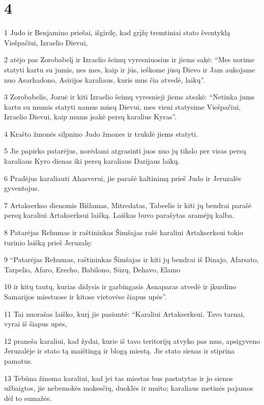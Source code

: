 \chapter{4}


\par 1 Judo ir Benjamino priešai, išgirdę, kad grįžę tremtiniai stato šventyklą Viešpačiui, Izraelio Dievui, 
\par 2 atėjo pas Zorobabelį ir Izraelio šeimų vyresniuosius ir jiems sakė: “Mes norime statyti kartu su jumis, nes mes, kaip ir jūs, ieškome jūsų Dievo ir Jam aukojame nuo Asarhadono, Asirijos karaliaus, kuris mus čia atvedė, laikų”. 
\par 3 Zorobabelis, Jozuė ir kiti Izraelio šeimų vyresnieji jiems atsakė: “Netinka jums kartu su mumis statyti namus mūsų Dievui, mes vieni statysime Viešpačiui, Izraelio Dievui, kaip mums įsakė persų karalius Kyras”. 
\par 4 Krašto žmonės silpnino Judo žmones ir trukdė jiems statyti. 
\par 5 Jie papirko patarėjus, norėdami atgrasinti juos nuo jų tikslo per visas persų karaliaus Kyro dienas iki persų karaliaus Darijaus laikų. 
\par 6 Pradėjus karaliauti Ahasverui, jie parašė kaltinimą prieš Judo ir Jeruzalės gyventojus. 
\par 7 Artakserkso dienomis Bišlamas, Mitredatas, Tabeelis ir kiti jų bendrai parašė persų karaliui Artakserksui laišką. Laiškas buvo parašytas aramėjų kalba. 
\par 8 Patarėjas Rehumas ir raštininkas Šimšajas rašė karaliui Artakserksui tokio turinio laišką prieš Jeruzalę: 
\par 9 “Patarėjas Rehumas, raštininkas Šimšajas ir kiti jų bendrai iš Dinajo, Afarsato, Tarpelio, Afaro, Erecho, Babilono, Sūzų, Dehavo, Elamo 
\par 10 ir kitų tautų, kurias didysis ir garbingasis Asnaparas atvedė ir įkurdino Samarijos miestuose ir kitose vietovėse šiapus upės”. 
\par 11 Tai nuorašas laiško, kurį jie pasiuntė: “Karaliui Artakserksui. Tavo tarnai, vyrai iš šiapus upės, 
\par 12 praneša karaliui, kad žydai, kurie iš tavo teritorijų atvyko pas mus, apsigyveno Jeruzalėje ir stato tą maištingą ir blogą miestą. Jie stato sienas ir stiprina pamatus. 
\par 13 Tebūna žinoma karaliui, kad jei tas miestas bus pastatytas ir jo sienos užbaigtos, jie nebemokės mokesčių, duoklės ir muito; karaliaus metinės pajamos dėl to sumažės. 
